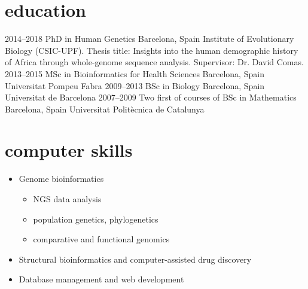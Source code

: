 \documentclass[]{friggeri-cv}
\begin{document}
\section{education}
\begin{entrylist}
	\entry
		{2014--2018}
		{PhD in Human Genetics}
		{Barcelona, Spain}
		{Institute of Evolutionary Biology (CSIC-UPF). Thesis title: Insights into the human demographic history of Africa through whole-genome sequence analysis. Supervisor: Dr. David Comas.}
	\entry
		{2013--2015}
		{MSc in Bioinformatics for Health Sciences}
		{Barcelona, Spain}
		{Universitat Pompeu Fabra}
	\entry
		{2009--2013}
		{BSc in Biology}
		{Barcelona, Spain}
		{Universitat de Barcelona}
	\entry
		{2007--2009}
		{{\normalfont Two first of courses of} BSc in Mathematics}
		{Barcelona, Spain}
		{Universitat Politècnica de Catalunya}
\end{entrylist}


%
%
%

\section{computer skills}

\begin{entrylist}
	{
	\vspace*{-4mm}
	\begin{itemize}
	\item Genome bioinformatics
		\begin{itemize}
			\item NGS data analysis
			\item population genetics, phylogenetics
			\item comparative and functional genomics
		\end{itemize}
	\item Structural bioinformatics and computer-assisted drug discovery
	\item Database management and web development
	\end{itemize}
	}
\end{entrylist}
\end{document}
